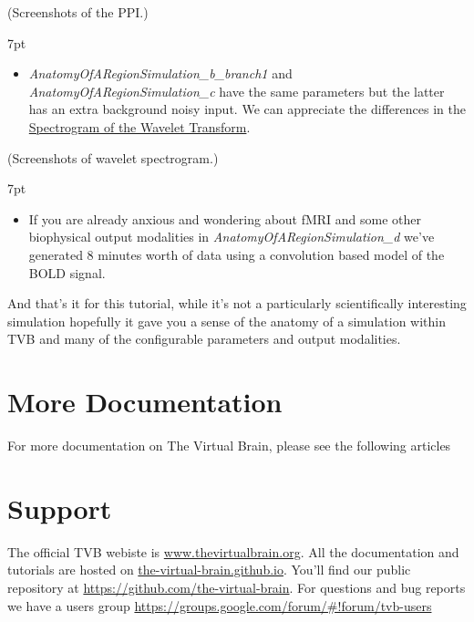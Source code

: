 \documentclass{tufte-handout}
\newenvironment{simulation}{%
  \def\FrameCommand{%
    \hspace{1pt}%
    {\color{ForestGreen}\vrule width 2pt}%
    {\color{simulationshade}\vrule width 4pt}%
    \colorbox{simulationshade}%
  }%
  \MakeFramed{\advance\hsize-\width\FrameRestore}%
  \noindent\hspace{-4.55pt}%
  \begin{adjustwidth}{}{7pt}%
  \vspace{2pt}\vspace{2pt}%
}
{%
  \vspace{2pt}\end{adjustwidth}\endMakeFramed%
}
\begin{document}
(Screenshots of the PPI.)


\begin{simulation}
\begin{itemize}
 \item \textit{AnatomyOfARegionSimulation\_b\_branch1} and \textit{AnatomyOfARegionSimulation\_c} have the same parameters but the latter has an extra background noisy input. We can appreciate the differences in the \underline{Spectrogram of the Wavelet Transform}.
\end{itemize}
\end{simulation}


(Screenshots of wavelet spectrogram.)


\begin{simulation}
\begin{itemize}
 \item If you are already anxious and wondering about fMRI and some other biophysical output modalities in \textit{AnatomyOfARegionSimulation\_d} we've generated 8 minutes worth of data using a convolution based model of the BOLD signal. 
\end{itemize}
\end{simulation}


And that's it for this tutorial, while it's not a particularly scientifically
interesting simulation hopefully it gave you a sense of the anatomy of a
simulation within TVB and many of the configurable parameters and output
modalities.


\section{More Documentation}\label{sec:more-doc}
For more documentation on The Virtual Brain, please see the following articles \cite{Sanz-Leon_2013, Spiegler_2013, Woodman_2014, Jirsa_2010b}


\section{Support}\label{sec:support}

The official TVB webiste is \url{www.thevirtualbrain.org}.  
All the documentation and tutorials are hosted on \url{the-virtual-brain.github.io}.
You'll find our public  repository at \url{https://github.com/the-virtual-brain}. 
For questions and bug reports we have a users group \url{https://groups.google.com/forum/#!forum/tvb-users}



\end{document}
